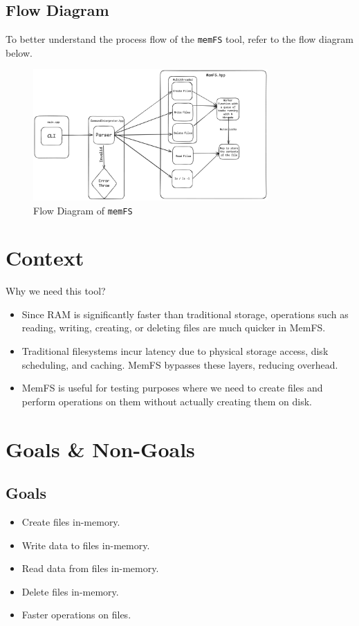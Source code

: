 \documentclass{article}
\begin{document}
\subsection*{Flow Diagram}
To better understand the process flow of the \texttt{memFS} tool, refer to the flow diagram below.

\begin{figure}[H]
    \centering
    \includegraphics[width=0.8\textwidth]{./pictures/flow_diagram.png}
    \caption{\label{fig:flow_diagram}Flow Diagram of \texttt{memFS}}
\end{figure}


\section{Context}
Why we need this tool?
\begin{itemize}
    \item Since RAM is significantly faster than traditional storage, operations such as reading, writing, creating, or deleting files are much quicker in MemFS.
    \item Traditional filesystems incur latency due to physical storage access, disk scheduling, and caching. MemFS bypasses these layers, reducing overhead.
    \item MemFS is useful for testing purposes where we need to create files and perform operations on them without actually creating them on disk.
\end{itemize}

\section{Goals \& Non-Goals}

\subsection{Goals}
\begin{itemize}
      \item Create files in-memory.
      \item Write data to files in-memory.
      \item Read data from files in-memory.
      \item Delete files in-memory.
      \item Faster operations on files.
\end{itemize}
\end{document}
